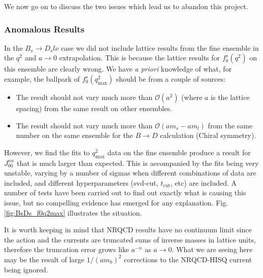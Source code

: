 We now go on to discuss the two issues which lead us to abandon this project.

\subsubsection{Anomalous Results}

In the $B_s\to D_s l\nu$ case we did not include lattice results from the fine ensemble in the $q^2$ and $a\to 0$ extrapolation. This is because the lattice results for $f_0^s(q^2)$ on this ensemble are clearly wrong. We have {\textit{a priori}} knowledge of what, for example, the ballpark of $f_0^s(q^2_{\text{max}})$ should be from a couple of sources:
\begin{itemize}
\item
The result should not vary much more than $\mathcal{O}(a^2)$ (where $a$ is the lattice spacing) from the same result on other ensembles.
\item
  The result should not vary much more than $\mathcal{O}(am_s - am_l)$ from the same number on the same ensemble for the $B\to D$ calculation (Chiral symmetry).
\end{itemize}
However, we find the fits to $q^2_{\text{max}}$ data on the fine ensemble produce a result for $J^{nn}_{00}$ that is much larger than expected. This is accompanied by the fits being very unstable, varying by a number of sigmas when different combinations of data are included, and different hyperparameters (svd-cut, $t_{\text{cut}}$, etc) are included. A number of tests have been carried out to find out exactly what is causing this issue, but no compelling evidence has emerged for any explanation. Fig. \ref{fig:BsDs_f0q2max} illustrates the situation.

It is worth keeping in mind that NRQCD results have no continuum limit since the action and the currents are truncated sums of inverse masses in lattice units, therefore the truncation error grows like $a^{-n}$ as $a\to 0$. What we are seeing here may be the result of large $1/(am_b)^2$ corrections to the NRQCD-HISQ current being ignored.


